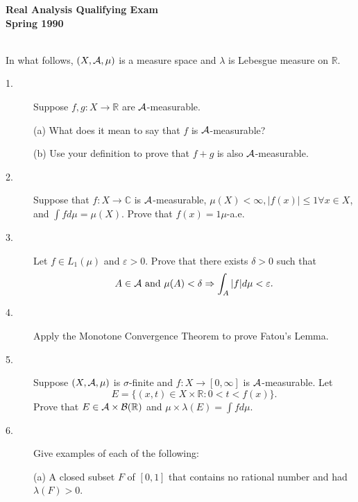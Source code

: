\documentclass{article}
\def\R{\mathbb R}
\def\C{\mathbb C}
\begin{document}






\begin{center}\begin{LARGE}
{\bf Real Analysis Qualifying Exam}\\ 
{\bf Spring 1990}\\ \end{LARGE}
\end{center}
\vspace{0.1in}
\noindent\hrulefill\\

In what follows, $(X, {\cal A}, \mu)$ is a measure space and $\lambda$ is
Lebesgue measure on $\R$.

\begin{description}
\item[1.]
Suppose $f,g: X \to \R$ are ${\cal A}$-measurable.

\item[\quad] (a)
What does it mean to say that $f$ is ${\cal A}$-measurable?

\item[\quad] (b)
Use your definition to prove that $f+g$ is also ${\cal A}$-measurable.

\item[2.]
Suppose that $f:X \to \C$ is ${\cal A}$-measurable,
$\mu(X) < \infty, |f(x)| \leq 1 \forall x \in X$, and
$\int fd\mu = \mu (X)$. Prove that $f(x)=1 \mu$-a.e.

\item[3.]
Let $f \in L_1(\mu)$ and $\varepsilon >0$. Prove that there exists
$\delta >0$ such that
$$A \in {\cal A} \hbox{\ and\ } \mu(A) < \delta \Rightarrow
  \int_A |f| d\mu < \varepsilon.$$

\item[4.]
Apply the Monotone Convergence Theorem to prove Fatou's Lemma.

\item[5.]
Suppose $(X, {\cal A}, \mu)$ is $\sigma$-finite and $f:X \to [0, \infty]$
is ${\cal A}$-measurable. Let
$$E=\{(x,t) \in X \times \R : 0 < t< f(x)\}.$$
Prove that $E \in {\cal A} \times {\cal B} (\R)$ and
$\mu \times \lambda (E) = \int fd\mu$.

\item[6.]
Give examples of each of the following:

\item[\quad] (a)
A closed subset $F$ of $[0,1]$ that contains no rational number and had
$\lambda (F) >0$.


\end{description}
\end{document}
